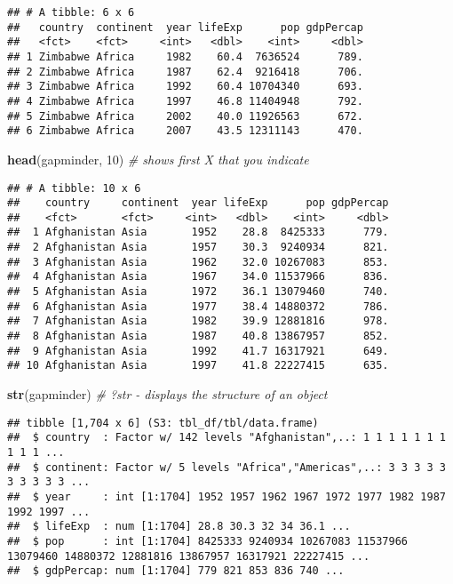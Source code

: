 \documentclass[
]{article}
\newenvironment{Shaded}{\begin{snugshade}}{\end{snugshade}}
\newcommand{\CommentTok}[1]{\textcolor[rgb]{0.56,0.35,0.01}{\textit{#1}}}
\newcommand{\DecValTok}[1]{\textcolor[rgb]{0.00,0.00,0.81}{#1}}
\newcommand{\FunctionTok}[1]{\textcolor[rgb]{0.13,0.29,0.53}{\textbf{#1}}}
\newcommand{\NormalTok}[1]{#1}
\begin{document}
\begin{verbatim}
## # A tibble: 6 x 6
##   country  continent  year lifeExp      pop gdpPercap
##   <fct>    <fct>     <int>   <dbl>    <int>     <dbl>
## 1 Zimbabwe Africa     1982    60.4  7636524      789.
## 2 Zimbabwe Africa     1987    62.4  9216418      706.
## 3 Zimbabwe Africa     1992    60.4 10704340      693.
## 4 Zimbabwe Africa     1997    46.8 11404948      792.
## 5 Zimbabwe Africa     2002    40.0 11926563      672.
## 6 Zimbabwe Africa     2007    43.5 12311143      470.
\end{verbatim}

\begin{Shaded}
\begin{Highlighting}[]
\FunctionTok{head}\NormalTok{(gapminder, }\DecValTok{10}\NormalTok{) }\CommentTok{\# shows first X that you indicate}
\end{Highlighting}
\end{Shaded}

\begin{verbatim}
## # A tibble: 10 x 6
##    country     continent  year lifeExp      pop gdpPercap
##    <fct>       <fct>     <int>   <dbl>    <int>     <dbl>
##  1 Afghanistan Asia       1952    28.8  8425333      779.
##  2 Afghanistan Asia       1957    30.3  9240934      821.
##  3 Afghanistan Asia       1962    32.0 10267083      853.
##  4 Afghanistan Asia       1967    34.0 11537966      836.
##  5 Afghanistan Asia       1972    36.1 13079460      740.
##  6 Afghanistan Asia       1977    38.4 14880372      786.
##  7 Afghanistan Asia       1982    39.9 12881816      978.
##  8 Afghanistan Asia       1987    40.8 13867957      852.
##  9 Afghanistan Asia       1992    41.7 16317921      649.
## 10 Afghanistan Asia       1997    41.8 22227415      635.
\end{verbatim}

\begin{Shaded}
\begin{Highlighting}[]
\FunctionTok{str}\NormalTok{(gapminder) }\CommentTok{\# ?str {-} displays the structure of an object}
\end{Highlighting}
\end{Shaded}

\begin{verbatim}
## tibble [1,704 x 6] (S3: tbl_df/tbl/data.frame)
##  $ country  : Factor w/ 142 levels "Afghanistan",..: 1 1 1 1 1 1 1 1 1 1 ...
##  $ continent: Factor w/ 5 levels "Africa","Americas",..: 3 3 3 3 3 3 3 3 3 3 ...
##  $ year     : int [1:1704] 1952 1957 1962 1967 1972 1977 1982 1987 1992 1997 ...
##  $ lifeExp  : num [1:1704] 28.8 30.3 32 34 36.1 ...
##  $ pop      : int [1:1704] 8425333 9240934 10267083 11537966 13079460 14880372 12881816 13867957 16317921 22227415 ...
##  $ gdpPercap: num [1:1704] 779 821 853 836 740 ...
\end{verbatim}
\end{document}
